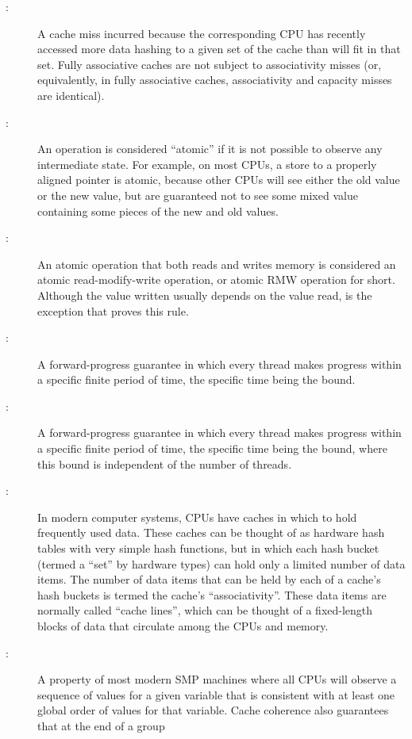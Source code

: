 \begin{description}
\item[:]
	A cache miss incurred because the corresponding CPU has recently
	accessed more data hashing to a given set of the cache than will
	fit in that set.
	Fully associative caches are not subject to associativity misses
	(or, equivalently, in fully associative caches, associativity
	and capacity misses are identical).
\item[:]
	An operation is considered ``atomic'' if it is not possible to
	observe any intermediate state.
	For example, on most CPUs, a store to a properly aligned pointer
	is atomic, because other CPUs will see either the old value or
	the new value, but are guaranteed not to see some mixed value
	containing some pieces of the new and old values.
\item[:]
	An atomic operation that both reads and writes memory is
	considered an atomic read-modify-write operation, or atomic RMW
	operation for short.
	Although the value written usually depends on the value read,
	 is the exception that proves this rule.
\item[:]
	A forward-progress guarantee in which every thread makes
	progress within a specific finite period of time, the specific
	time being the bound.
\item[:]
	A forward-progress guarantee in which every thread makes
	progress within a specific finite period of time, the specific
	time being the bound, where this bound is independent of the
	number of threads.
\item[:]
	In modern computer systems, CPUs have caches in which to hold
	frequently used data.
	These caches can be thought of as hardware hash tables with very
	simple hash functions,
	but in which each hash bucket (termed a ``set'' by hardware types)
	can hold only a limited number of data items.
	The number of data items that can be held by each of a cache's hash
	buckets is termed the cache's ``associativity''.
	These data items are normally called ``cache lines'', which
	can be thought of a fixed-length blocks of data that circulate
	among the CPUs and memory.
\item[:]
	A property of most modern SMP machines where all CPUs will
	observe a sequence of values for a given variable that is
	consistent with at least one global order of values for
	that variable.
	Cache coherence also guarantees that at the end of a group

\end{description}
